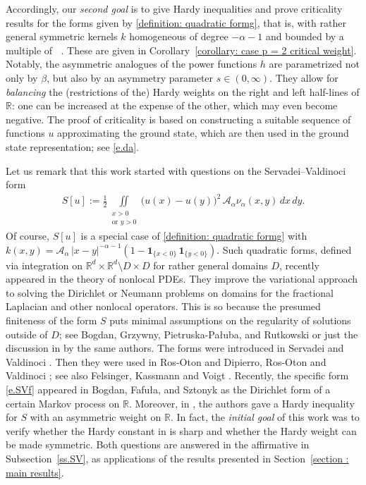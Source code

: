 \documentclass[12pt, a4paper]{amsart}
\newcommand{\Rd}{{\R^d}}
\DeclareMathOperator{\Mass}{\nu_{\alpha}}
\newcommand{\R}{\mathbb{R}}
\begin{document}
 
 Accordingly, our \textit{second goal} is to give Hardy inequalities and prove criticality results for the forms given by \eqref{definition: quadratic formg}, that is, with rather general symmetric kernels $k$ homogeneous of degree $-\alpha-1$ and bounded by a multiple of $\Mass$. These are given in Corollary~\ref{corollary: case p = 2 critical weight}. 
 Notably, the asymmetric analogues of the power functions \( h \) are parametrized not only by \( \beta \), but also by an asymmetry parameter \( s \in (0, \infty) \).
They allow for \textit{balancing} the (restrictions of the) Hardy weights on the right and left half-lines of $\R$: one can be increased at the expense of the other, which may even become negative.
The proof of criticality is based on constructing a suitable sequence of functions $u$ approximating the ground state, which are then used in the ground state representation; see \eqref{e.da}.



 Let us remark that this work started with questions on  the Servadei--Valdinoci form
\begin{align}\label{e.SVf}
    S[u] := \frac{1}{2} \iint\limits_{\substack{x > 0 \\ \text{or } y > 0}} \bigl(u(x) - u(y)\bigr)^2\, \mathcal{A}_\alpha \nu_\alpha(x,y)\, dx\, dy.
\end{align}
Of course, $S[u]$ is a special case of \eqref{definition: quadratic formg} with $
k(x,y) = \mathcal{A}_\alpha\, |x - y|^{-\alpha - 1} \left(1 - \mathbf{1}_{\{x < 0\}}\, \mathbf{1}_{\{y < 0\}} \right)
$.
Such quadratic forms, defined via integration on $\Rd\times \Rd \setminus D\times D$ for rather general domains $D$, recently appeared in the theory of nonlocal PDEs. They improve the variational approach to solving the Dirichlet or Neumann problems on domains for the fractional Laplacian and other nonlocal operators. This is so because the presumed finiteness of the form $S$ puts minimal assumptions on the regularity of solutions outside of $D$; see Bogdan, Grzywny, Pietruska-Pałuba, and Rutkowski \cite{MR4088505} or just the discussion in \cite[Introduction]{MR4589708} by the same authors.
The forms were introduced  in Servadei and Valdinoci \cite{MR2879266, MR3002745}.
Then they were used in Ros-Oton \cite[(3.1)]{MR3447732} and Dipierro, Ros-Oton and Valdinoci \cite[p. 379]{MR3651008}; see also Felsinger, Kassmann and Voigt \cite[Definition 2.1 (ii)]{MR3318251}.
Recently, the specific form \eqref{e.SVf} appeared in Bogdan, Fafuła, and Sztonyk \cite{BogdanFafulaSztonyk2025} as the Dirichlet form of a certain Markov process on \( \mathbb{R} \).
 Moreover, in \cite[Theorem 1.2.1]{BogdanFafulaSztonyk2025}, the authors gave a Hardy inequality for $S$ with an asymmetric weight on $\R$. In fact, the \textit{initial goal} of this work was to verify whether the Hardy constant  in \cite{BogdanFafulaSztonyk2025} is sharp and whether the Hardy weight can be made symmetric.
 Both questions are answered in the affirmative in Subsection~\ref{ss.SV}, as applications of the results presented in Section~\ref{section : main results}.
 
\end{document}
